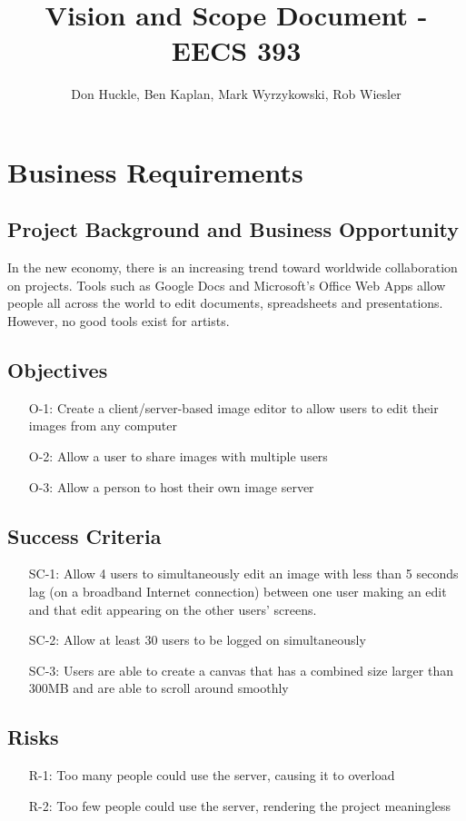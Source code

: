 \documentclass[11pt,oneside,a4paper]{article}
\title{Vision and Scope Document - EECS 393}
\author{Don Huckle, Ben Kaplan, Mark Wyrzykowski, Rob Wiesler}
\begin{document}
\maketitle
\tableofcontents
\pagebreak

\section{Business Requirements}
\subsection{Project Background and Business Opportunity}
In the new economy, there is an increasing trend toward worldwide collaboration on projects. Tools such as Google Docs and Microsoft's Office Web Apps allow people all across the world to edit documents, spreadsheets and presentations. However, no good tools exist for artists.
\subsection{Objectives}
\begin{itemize}
\item[O-1:] Create a client/server-based image editor to allow users to edit their images from any computer
\item[O-2:] Allow a user to share images with multiple users
\item[O-3:] Allow a person to host their own image server
\end{itemize}
\subsection{Success Criteria}
\begin{itemize}
\item[SC-1:] Allow 4 users to simultaneously edit an image with less than 5 seconds lag (on a broadband Internet connection) between one user making an edit and that edit appearing on the other users’ screens.
\item[SC-2:] Allow at least 30 users to be logged on simultaneously
\item[SC-3:] Users are able to create a canvas that has a combined size larger than 300MB and are able to scroll around smoothly
\end{itemize}
\subsection{Risks}
\begin{itemize}
\item[R-1:] Too many people could use the server, causing it to overload
\item[R-2:] Too few people could use the server, rendering the project meaningless
\end{itemize}
\end{document}
